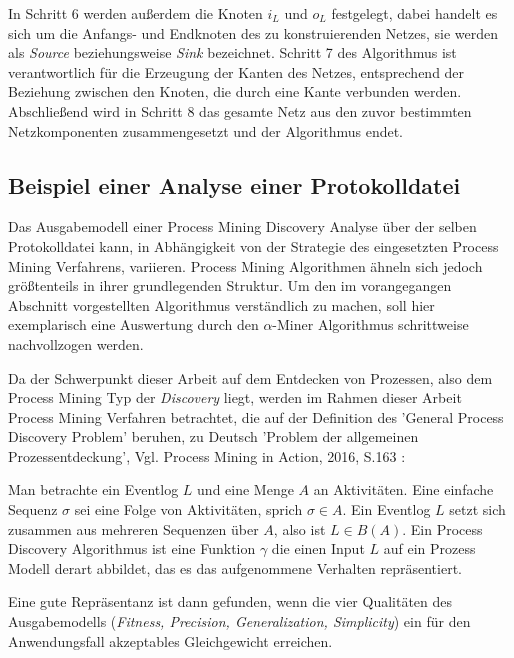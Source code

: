 In Schritt 6 werden außerdem die Knoten $i_L$ und $o_L$ festgelegt, dabei handelt es sich um die Anfangs- und Endknoten des zu konstruierenden Netzes, sie werden als \textit{Source} beziehungsweise \textit{Sink} bezeichnet. Schritt 7 des Algorithmus ist verantwortlich für die Erzeugung der Kanten des Netzes, entsprechend der Beziehung zwischen den Knoten, die durch eine Kante verbunden werden. Abschließend wird in Schritt 8 das gesamte Netz aus den zuvor bestimmten Netzkomponenten zusammengesetzt und der Algorithmus endet.
\newpage
\subsection{Beispiel einer Analyse einer Protokolldatei}
Das Ausgabemodell einer Process Mining Discovery Analyse über der selben Protokolldatei kann, in Abhängigkeit von der Strategie des eingesetzten Process Mining Verfahrens, variieren. Process Mining Algorithmen ähneln sich jedoch größtenteils in ihrer grundlegenden Struktur. Um den im vorangegangen Abschnitt vorgestellten Algorithmus verständlich zu machen, soll hier exemplarisch eine Auswertung durch den $\alpha$-Miner Algorithmus schrittweise nachvollzogen werden.

Da der Schwerpunkt dieser Arbeit auf dem Entdecken von Prozessen, also dem Process Mining Typ der \textit{ Discovery} liegt, werden im Rahmen dieser Arbeit Process Mining Verfahren betrachtet, die auf der Definition des 'General Process Discovery Problem' beruhen, zu Deutsch 'Problem der allgemeinen Prozessentdeckung', Vgl. Process Mining in Action, 2016, S.163 \cite{PMinAction}:
\begin{addmargin}[20pt]{20pt} 
Man betrachte ein Eventlog $L$ und eine Menge $A$ an Aktivitäten. Eine einfache Sequenz $\sigma$ sei eine Folge von Aktivitäten, sprich $\sigma ∈ A $. Ein Eventlog $L$ setzt sich zusammen aus mehreren Sequenzen über $A$, also ist $L ∈ B(A)$. Ein Process Discovery Algorithmus ist eine Funktion $\gamma$ die einen Input $L$ auf ein Prozess Modell derart abbildet, das es das aufgenommene Verhalten repräsentiert.
\end{addmargin}
Eine gute Repräsentanz ist dann gefunden, wenn die vier Qualitäten des Ausgabemodells (\textit{Fitness, Precision, Generalization, Simplicity}) ein für den Anwendungsfall akzeptables Gleichgewicht erreichen.


